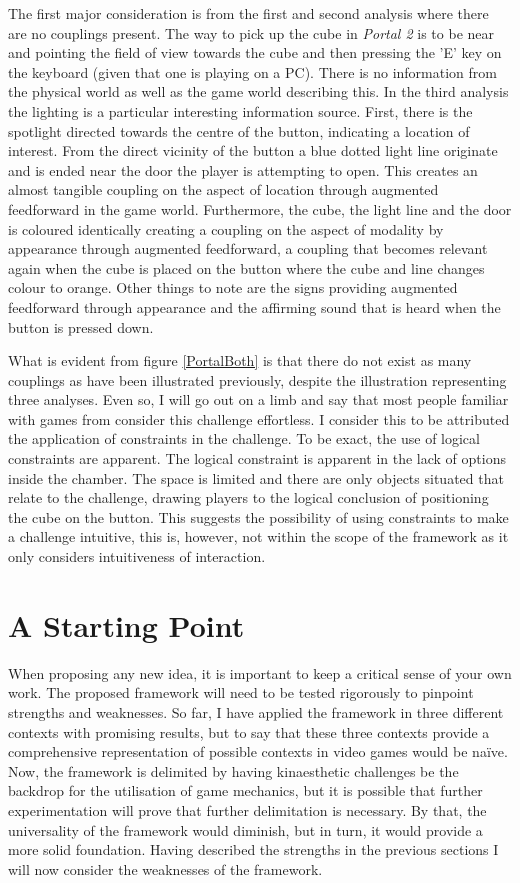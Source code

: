 The first major consideration is from the first and second analysis where there are no couplings present. The way to pick up the cube in \textit{Portal 2} is to be near and pointing the field of view towards the cube and then pressing the 'E' key on the keyboard (given that one is playing on a PC). There is no information from the physical world as well as the game world describing this. In the third analysis the lighting is a particular interesting information source. First, there is the spotlight directed towards the centre of the button, indicating a location of interest. From the direct vicinity of the button a blue dotted light line originate and is ended near the door the player is attempting to open. This creates an almost tangible coupling on the aspect of location through augmented feedforward in the game world. Furthermore, the cube, the light line and the door is coloured identically creating a coupling on the aspect of modality by appearance through augmented feedforward, a coupling that becomes relevant again when the cube is placed on the button where the cube and line changes colour to orange. Other things to note are the signs providing augmented feedforward through appearance and the affirming sound that is heard when the button is pressed down.

What is evident from figure \ref{PortalBoth} is that there do not exist as many couplings as have been illustrated previously, despite the illustration representing three analyses. Even so, I will go out on a limb and say that most people familiar with games from  consider this challenge effortless. I consider this to be attributed the application of constraints in the challenge. To be exact, the use of logical constraints are apparent. The logical constraint is apparent in the lack of options inside the chamber. The space is limited and there are only objects situated that relate to the challenge, drawing players to the logical conclusion of positioning the cube on the button. This suggests the possibility of using constraints to make a challenge intuitive, this is, however, not within the scope of the framework as it only considers intuitiveness of interaction.

\section{A Starting Point}
When proposing any new idea, it is important to keep a critical sense of your own work. The proposed framework will need to be tested rigorously to pinpoint strengths and weaknesses. So far, I have applied the framework in three different contexts with promising results, but to say that these three contexts provide a comprehensive representation of possible contexts in video games would be naïve. Now, the framework is delimited by having kinaesthetic challenges be the backdrop for the utilisation of game mechanics, but it is possible that further experimentation will prove that further delimitation is necessary. By that, the universality of the framework would diminish, but in turn, it would provide a more solid foundation. Having described the strengths in the previous sections I will now consider the weaknesses of the framework.

